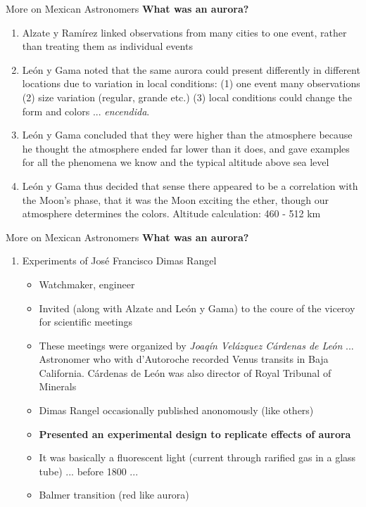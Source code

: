 \documentclass{beamer}
\begin{document}
\begin{frame}{More on Mexican Astronomers}
\small
\textbf{What was an aurora?}
\begin{enumerate}
\item Alzate y Ram\'{i}rez linked observations from many cities to one event, rather than treating them as individual events
\item Le\'{o}n y Gama noted that the same aurora could present differently in different locations due to variation in local conditions: (1) one event many observations (2) size variation (regular, grande etc.) (3) local conditions could change the form and colors ... \textit{encendida}.
\item Le\'{o}n y Gama concluded that they were higher than the atmosphere because he thought the atmosphere ended far lower than it does, and gave examples for all the phenomena we know and the typical altitude above sea level
\item Le\'{o}n y Gama thus decided that sense there appeared to be a correlation with the Moon's phase, that it was the Moon exciting the ether, though our atmosphere determines the colors.  Altitude calculation: 460 - 512 km
\end{enumerate}
\end{frame}

\begin{frame}{More on Mexican Astronomers}
\small
\textbf{What was an aurora?}
\begin{enumerate}
\item Experiments of Jos\'{e} Francisco Dimas Rangel
\begin{itemize}
\item Watchmaker, engineer
\item Invited (along with Alzate and Le\'{o}n y Gama) to the coure of the viceroy for scientific meetings
\item These meetings were organized by \textit{Joaq\'{i}n Vel\'{a}zquez C\'{a}rdenas de Le\'{o}n} ... Astronomer who with d'Autoroche recorded Venus transits in Baja California. C\'{a}rdenas de Le\'{o}n was also director of Royal Tribunal of Minerals
\item Dimas Rangel occasionally published anonomously (like others)
\item \textbf{\alert{Presented an experimental design to replicate effects of aurora}}
\item It was basically a fluorescent light (current through rarified gas in a glass tube) ... before 1800 ...
\item Balmer transition (red like aurora)
\end{itemize}
\end{enumerate}
\end{frame}
\end{document}
